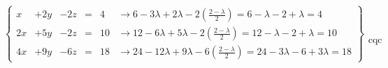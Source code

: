 \documentclass[palatino,nosec,nochap]{Docencia}
\begin{document}
\begin{problem}
\[
\left\{\begin{array}{lcccll}
x&+2y&-2z&=&4 &\to 6-3λ + 2λ - 2\displaystyle\left(\frac{2-λ}{2}\right) = 6-λ-2+λ = 4\\
2x&+5y&-2z&=&10 &\to 12-6λ +5λ - 2\displaystyle\left(\frac{2-λ}{2}\right) = 12-λ-2+λ = 10\\
4x&+9y&-6z&=&18 &\to 24-12λ + 9λ - 6\displaystyle\left(\frac{2-λ}{2}\right) = 24-3λ-6+3λ = 18
\end{array}\right\}\begin{array}{c}\\\\\\\\\text{cqc}\end{array}
\]

\end{problem}
\end{document}

